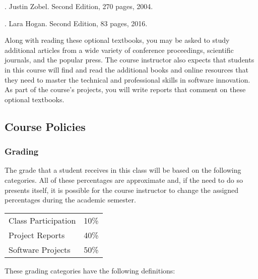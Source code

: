 \documentclass[11pt]{article}
\begin{document}
. Justin Zobel. Second Edition, 270
pages, 2004.
%
\vspace*{.25em}

. Lara Hogan. Second Edition, 83
pages, 2016.
%
\vspace*{1em}

\noindent Along with reading these optional textbooks, you may be asked to study
additional articles from a wide variety of conference proceedings, scientific
journals, and the popular press. The course instructor also expects that
students in this course will find and read the additional books and online
resources that they need to master the technical and professional skills in
software innovation. As part of the course's projects, you will write reports
that comment on these optional textbooks.

\subsection*{Course Policies}

\subsubsection*{Grading}

The grade that a student receives in this class will be based on the following
categories. All of these percentages are approximate and, if the need to do so
presents itself, it is possible for the course instructor to change the assigned
percentages during the academic semester.

\renewcommand{\arraystretch}{1.2}

\begin{center}
  \begin{tabular}{ll}
    Class Participation        & 10\%  \\
    Project Reports            & 40\% \\
    Software Projects          & 50\%
  \end{tabular}
\end{center}

\noindent
These grading categories have the following definitions:

\vspace*{-.05in}
\end{document}
